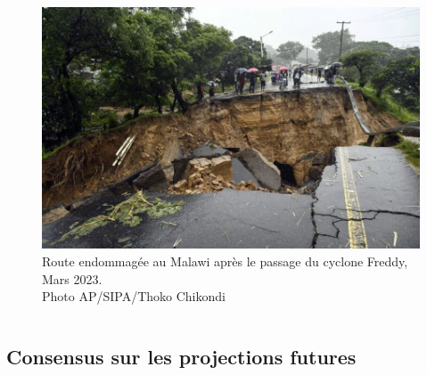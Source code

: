 \documentclass[aspectratio=169, usepdftitle=false, xcolor={dvipsnames}, 9pt]{beamer}
\begin{document}
\begin{frame}[c]
\begin{columns}
\begin{column}{0.45\textwidth}
\begin{figure}[h]
                 \includegraphics[width=\textwidth]{Figures/freddy_malawi_route.png}
                 \caption{Route endommagée au Malawi après le passage du cyclone Freddy, Mars 2023.\\Photo AP/SIPA/Thoko Chikondi}
             \end{figure}
        \end{column}
    \end{columns}
\end{frame}

\subsection{Consensus sur les projections futures}
\end{document}
